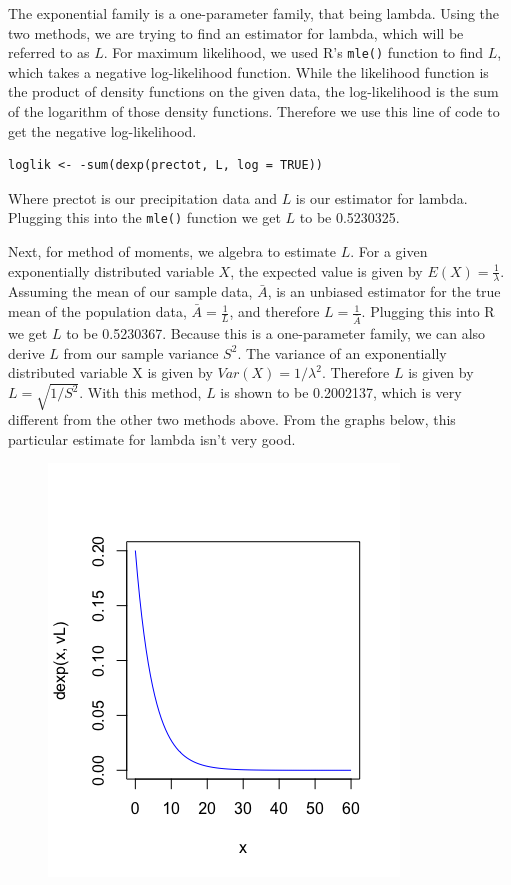 \documentclass[12pt, a4paper, oneside]{report}
\begin{document}
The exponential family is a one-parameter family, that being lambda. Using the two methods, we are trying to find an estimator for lambda, which will be referred to as \(L\).
For maximum likelihood, we used R's \lstinline{mle()} function to find \(L\), which takes a negative log-likelihood function.
While the likelihood function is the product of density functions on the given data, the log-likelihood is the sum of the logarithm of those density functions.
Therefore we use this line of code to get the negative log-likelihood.

\begin{lstlisting}
loglik <- -sum(dexp(prectot, L, log = TRUE))
\end{lstlisting}

Where prectot is our precipitation data and \(L\) is our estimator for lambda.
Plugging this into the \lstinline{mle()} function we get \(L\) to be 0.5230325.

Next, for method of moments, we algebra to estimate \(L\).
For a given exponentially distributed variable \(X\), the expected value is given by \(E(X) = \frac{1}{\lambda}\). Assuming the mean of our sample data, \(\bar{A}\), is an unbiased estimator for the true mean of the population data, \(\bar{A} = \frac{1}{L}\), and therefore \(L = \frac{1}{\bar{A}}\).
Plugging this into R we get \(L\) to be 0.5230367.
Because this is a one-parameter family, we can also derive \(L\) from our sample variance \(S^2\). The variance of an exponentially distributed variable X is given by \(Var(X) = 1 / \lambda^2\). Therefore \(L\) is given by \(L = \sqrt{1 / S^2}\).
With this method, \(L\) is shown to be 0.2002137, which is very different from the other two methods above. From the graphs below, this particular estimate for lambda isn't very good. 

\begin{figure}[h]
  \centering
  \includegraphics[scale=0.5]{images/vL.png}
  \caption{}
\end{figure}
\end{document}
